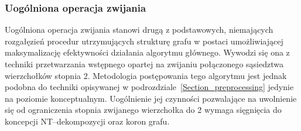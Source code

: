 \subsubsection{\textbf{Uogólniona operacja zwijania}}\label{sss_ckx_general_fold}
\par{
  Uogólniona operacja zwijania stanowi drugą z podstawowych, niemających rozgałęzień procedur utrzymujących strukturę grafu w postaci umożliwiającej maksymalizację efektywności działania algorytmu głównego.
  Wywodzi się ona z techniki przetwarzania wstępnego opartej na zwijaniu połączonego sąsiedztwa wierzchołków stopnia 2.
  Metodologia postępowania tego algorytmu jest jednak podobna do techniki opisywanej w podrozdziale~\ref{Section_preprocessing} jedynie na poziomie konceptualnym.
  Uogólnienie jej czynności pozwalające na uwolnienie się od ograniczenia stopnia zwijanego wierzchołka do 2 wymaga sięgnięcia do koncepcji NT--dekompozycji oraz koron grafu.
}
